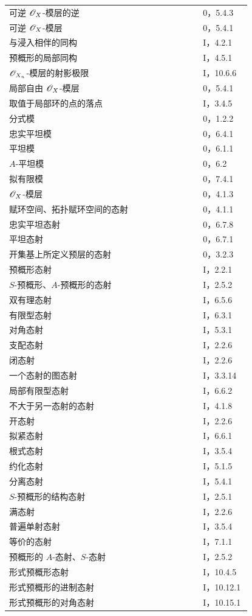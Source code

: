 \begin{longtable}{@{}p{0.76\linewidth}p{0.19\linewidth}@{}}
可逆 $\mathscr O_X$-模层的逆&0，5.4.3\\
可逆 $\mathscr O_X$-模层&0，5.4.1\\
与浸入相伴的同构&I，4.2.1\\
预概形的局部同构&I，4.5.1\\
$\mathscr O_{X_n}$-模层的射影极限&I，10.6.6\\
局部自由 $\mathscr O_X$-模层&0，5.4.1\\
取值于局部环的点的落点&I，3.4.5\\
分式模&0，1.2.2\\
忠实平坦模&0，6.4.1\\
平坦模&0，6.1.1\\
$A$-平坦模&0，6.2\\
拟有限模&0，7.4.1\\
$\mathscr O_X$-模层&0，4.1.3\\
赋环空间、拓扑赋环空间的态射&0，4.1.1\\
忠实平坦态射&0，6.7.8\\
平坦态射&0，6.7.1\\
开集基上所定义预层的态射&0，3.2.3\\
预概形态射&I，2.2.1\\
$S$-预概形、$A$-预概形的态射&I，2.5.2\\
双有理态射&I，6.5.6\\
有限型态射&I，6.3.1\\
对角态射&I，5.3.1\\
支配态射&I，2.2.6\\
闭态射&I，2.2.6\\
一个态射的图态射&I，3.3.14\\
局部有限型态射&I，6.6.2\\
不大于另一态射的态射&I，4.1.8\\
开态射&I，2.2.6\\
拟紧态射&I，6.6.1\\
根式态射&I，3.5.4\\
约化态射&I，5.1.5\\
分离态射&I，5.4.1\\
$S$-预概形的结构态射&I，2.5.1\\
满态射&I，2.2.6\\
普遍单射态射&I，3.5.4\\
等价的态射&I，7.1.1\\
预概形的 $A$-态射、$S$-态射&I，2.5.2\\
形式预概形态射&I，10.4.5\\
形式预概形的进制态射&I，10.12.1\\
形式预概形的对角态射&I，10.15.1\\

\end{longtable}
